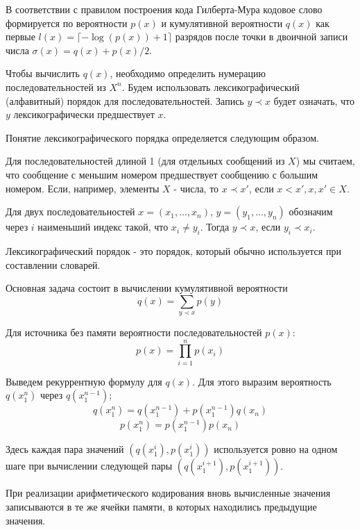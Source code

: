 \documentclass[14pt]{article}
\begin{document}
В соответствии с правилом построения кода Гилберта-Мура кодовое слово формируется по вероятности \(p(x)\) и кумулятивной вероятности \(q(x)\) как первые \(l(x) = \lceil -\log(p(x)) + 1\rceil\) разрядов после точки в двоичной записи числа \(\sigma(x) = q(x) + p(x)/2\).

Чтобы вычислить \(q(x)\), необходимо определить нумерацию последовательностей из \(X^n\). Будем использовать лексикографический (алфавитный) порядок для последовательностей. Запись \(y \prec x\) будет означать, что \(y\) лексикографически предшествует \(x\).

Понятие лексикографического порядка определяется следующим образом.

Для последовательностей длиной 1 (для отдельных сообщений из \(X\)) мы считаем, что сообщение с меньшим номером предшествует сообщению с большим номером. Если, например, элементы \(X\) - числа, то \(x \prec x'\), если \(x < x', x,x' \in X\).

Для двух последовательностей \(x = (x_1,...,x_n)\), \(y = (y_1,...,y_n)\) обозначим через \(i\) наименьший индекс такой, что \(x_i \neq y_i\). Тогда \(y \prec x\), если \(y_i \prec x_i\).

Лексикографический порядок - это порядок, который обычно используется при составлении словарей.

Основная задача состоит в вычислении кумулятивной вероятности
\begin{displaymath}
    q(x) = \sum_{y \prec x} p(y)
\end{displaymath}

Для источника без памяти вероятности последовательностей \(p(x)\):
\begin{displaymath}
    p(x) = \prod_{i=1}^{n} p(x_i)
\end{displaymath}

Выведем рекуррентную формулу для \(q(x)\). Для этого выразим вероятность \(q(x_1^n)\) через \(q(x_1^{n-1})\);
\begin{displaymath}
    q(x_1^n) = q(x_1^{n-1}) + p(x_1^{n-1})q(x_n)
\end{displaymath}
\begin{displaymath}
    p(x_1^n) = p(x_1^{n-1})p(x_n)
\end{displaymath}

Здесь каждая пара значений \((q(x_1^i), p(x_1^i))\) используется ровно на одном шаге при вычислении следующей пары \((q(x_1^{i+1}), p(x_1^{i+1}))\).

При реализации арифметического кодирования вновь вычисленные значения записываются в те же ячейки памяти, в которых находились предыдущие значения.
\end{document}
